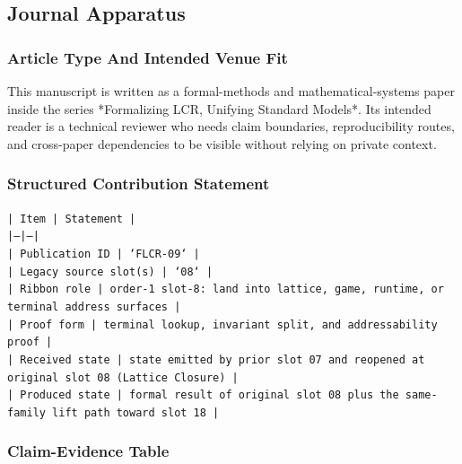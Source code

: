 \documentclass[11pt]{article}
\begin{document}
\subsection*{Journal Apparatus}

\subsubsection*{Article Type And Intended Venue Fit}

This manuscript is written as a formal-methods and mathematical-systems paper
inside the series *Formalizing LCR, Unifying Standard Models*. Its intended
reader is a technical reviewer who needs claim boundaries, reproducibility
routes, and cross-paper dependencies to be visible without relying on private
context.

\subsubsection*{Structured Contribution Statement}

\noindent\texttt{| Item | Statement |}\\
\noindent\texttt{|---|---|}\\
\noindent\texttt{| Publication ID | `FLCR-09` |}\\
\noindent\texttt{| Legacy source slot(s) | `08` |}\\
\noindent\texttt{| Ribbon role | order-1 slot-8: land into lattice, game, runtime, or terminal address surfaces |}\\
\noindent\texttt{| Proof form | terminal lookup, invariant split, and addressability proof |}\\
\noindent\texttt{| Received state | state emitted by prior slot 07 and reopened at original slot 08 (Lattice Closure) |}\\
\noindent\texttt{| Produced state | formal result of original slot 08 plus the same-family lift path toward slot 18 |}\\

\subsubsection*{Claim-Evidence Table}
\end{document}
